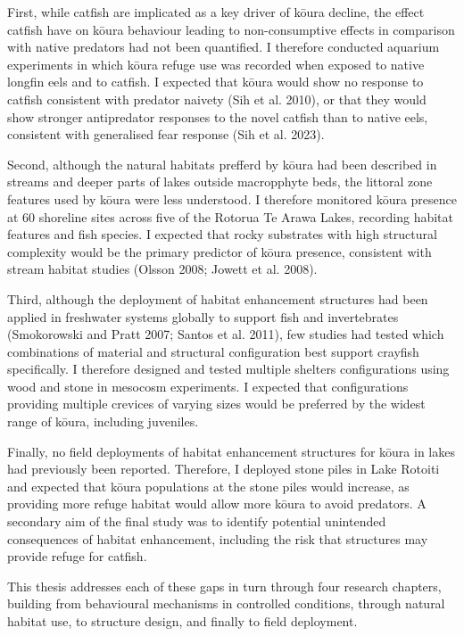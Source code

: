 \documentclass[
  12pt,
  a4paper,
  oneside]{scrbook}
\begin{document}
First, while catfish are implicated as a key driver of kōura decline,
the effect catfish have on kōura behaviour leading to non-consumptive
effects in comparison with native predators had not been quantified. I
therefore conducted aquarium experiments in which kōura refuge use was
recorded when exposed to native longfin eels and to catfish. I expected
that kōura would show no response to catfish consistent with predator
naivety (Sih et al. 2010), or that they would show stronger antipredator
responses to the novel catfish than to native eels, consistent with
generalised fear response (Sih et al. 2023).

Second, although the natural habitats prefferd by kōura had been
described in streams and deeper parts of lakes outside macropphyte beds,
the littoral zone features used by kōura were less understood. I
therefore monitored kōura presence at 60 shoreline sites across five of
the Rotorua Te Arawa Lakes, recording habitat features and fish species.
I expected that rocky substrates with high structural complexity would
be the primary predictor of kōura presence, consistent with stream
habitat studies (Olsson 2008; Jowett et al. 2008).

Third, although the deployment of habitat enhancement structures had
been applied in freshwater systems globally to support fish and
invertebrates (Smokorowski and Pratt 2007; Santos et al. 2011), few
studies had tested which combinations of material and structural
configuration best support crayfish specifically. I therefore designed
and tested multiple shelters configurations using wood and stone in
mesocosm experiments. I expected that configurations providing multiple
crevices of varying sizes would be preferred by the widest range of
kōura, including juveniles.

Finally, no field deployments of habitat enhancement structures for
kōura in lakes had previously been reported. Therefore, I deployed stone
piles in Lake Rotoiti and expected that kōura populations at the stone
piles would increase, as providing more refuge habitat would allow more
kōura to avoid predators. A secondary aim of the final study was to
identify potential unintended consequences of habitat enhancement,
including the risk that structures may provide refuge for catfish.

This thesis addresses each of these gaps in turn through four research
chapters, building from behavioural mechanisms in controlled conditions,
through natural habitat use, to structure design, and finally to field
deployment.
\end{document}
